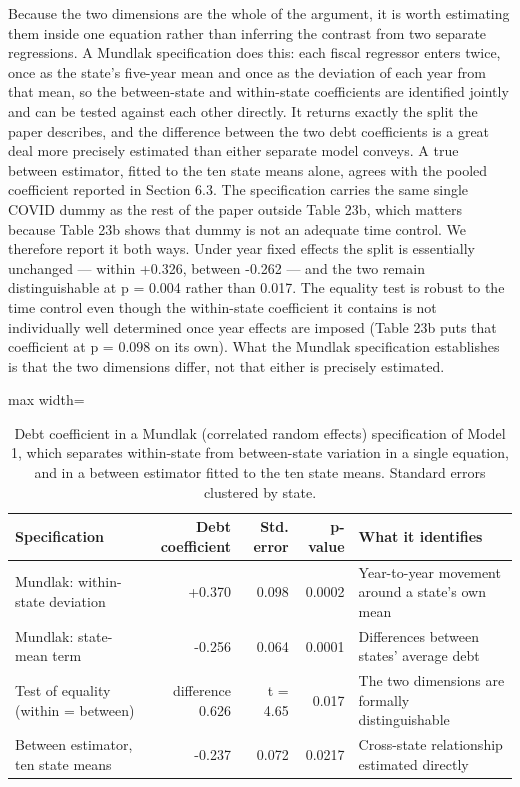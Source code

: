 \documentclass[12pt,a4paper]{article}
\begin{document}
Because the two dimensions are the whole of the argument, it is worth estimating them inside one equation rather than inferring the contrast from two separate regressions. A Mundlak specification does this: each fiscal regressor enters twice, once as the state's five-year mean and once as the deviation of each year from that mean, so the between-state and within-state coefficients are identified jointly and can be tested against each other directly. It returns exactly the split the paper describes, and the difference between the two debt coefficients is a great deal more precisely estimated than either separate model conveys. A true between estimator, fitted to the ten state means alone, agrees with the pooled coefficient reported in Section 6.3. The specification carries the same single COVID dummy as the rest of the paper outside Table 23b, which matters because Table 23b shows that dummy is not an adequate time control. We therefore report it both ways. Under year fixed effects the split is essentially unchanged --- within +0.326, between -0.262 --- and the two remain distinguishable at p = 0.004 rather than 0.017. The equality test is robust to the time control even though the within-state coefficient it contains is not individually well determined once year effects are imposed (Table 23b puts that coefficient at p = 0.098 on its own). What the Mundlak specification establishes is that the two dimensions differ, not that either is precisely estimated.

\begin{table}[H]
\centering
\caption{Debt coefficient in a Mundlak (correlated random effects) specification of Model 1, which separates within-state from between-state variation in a single equation, and in a between estimator fitted to the ten state means. Standard errors clustered by state.}
\label{tab:35}
\footnotesize
\begin{adjustbox}{max width=\textwidth}
\begin{tabular}{@{}lrrrl@{}}
\toprule
Specification & Debt coefficient & Std. error & p-value & What it identifies \\
\midrule
Mundlak: within-state deviation & +0.370 & 0.098 & 0.0002 & Year-to-year movement around a state's own mean \\
Mundlak: state-mean term & -0.256 & 0.064 & 0.0001 & Differences between states' average debt \\
Test of equality (within = between) & difference 0.626 & t = 4.65 & 0.017 & The two dimensions are formally distinguishable \\
Between estimator, ten state means & -0.237 & 0.072 & 0.0217 & Cross-state relationship estimated directly \\
\bottomrule
\end{tabular}
\end{adjustbox}
\end{table}
\end{document}
